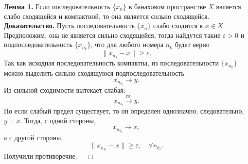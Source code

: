 \documentclass[12pt,a4paper, titlepage]{article}
\begin{document}
%
%

\textbf{Лемма 1.} Если последовательность $\{x_n\}$ в банаховом пространстве $X$ является слабо сходящейся и компактной, то она является сильно сходящейся.\\
\textbf{Доказательство.} Пусть последовательность $\{x_n\}$ слабо сходится к $x \in X$. Предположим, она не является сильно сходящейся, тогда найдутся такие $\varepsilon > 0$ и подпоследовательность $\{x_{n_k}\}$, что для любого номера $n_k$ будет верно
$$
\|x_{n_k} - x\| \geqslant \varepsilon.
$$
Так как исходная последовательность компактна, из последовательности $\{x_{n_k}\}$ можно выделить сильно сходящуюся подпоследовательность
$$
x_{n_{k_l}} \to y.
$$
Из сильной сходимости вытекает слабая:
$$
x_{n_{k_l}} \xrightarrow{\text{сл.}} y.
$$
Но если слабый предел существует, то он определен однозначно; следовательно, $y = x$. Тогда, с одной стороны, 
$$
x_{n_{k_l}} \to x,
$$
а с другой стороны,
$$
\|x_{n_{k_l}} - x\| \geqslant \varepsilon, \quad \forall n_{k_l}.
$$
Получили противоречие. $\quad \Box$\\
\end{document}
